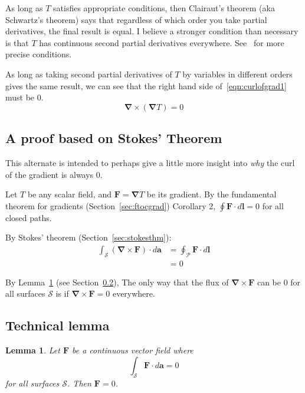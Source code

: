 \documentclass[a4paper]{article}
\theoremstyle{plain}
\newtheorem{lemma}[theorem]{Lemma}
\theoremstyle{definition}
\newcommand{\vect}[1]{\textbf{#1}}
\newcommand{\del}{\bm{\nabla}}
\begin{document}
As long as $T$ satisfies appropriate conditions, then Clairaut's
theorem (aka Schwartz's theorem) says that regardless of which order
you take partial derivatives, the final result is equal.  I believe a
stronger condition than necessary is that $T$ has continuous second
partial derivatives everywhere.
See~\cite{SymmetryOfSecondDerivatives} for more precise conditions.

As long as taking second partial derivatives of $T$ by variables in
different orders gives the same result, we can see that the right hand
side of~\eqref{eqn:curlofgrad1} must be 0.
\begin{equation}
\del \times (\del T) = 0
\end{equation}


\subsection{A proof based on Stokes' Theorem}

This alternate is intended to perhaps give a little more insight into
{\em why} the curl of the gradient is always 0.

Let $T$ be any scalar field, and $\vect{F} = \del T$ be its gradient.
By the fundamental theorem for gradients (Section~\ref{sec:ftocgrad})
Corollary 2, $\oint \vect{F} \cdot d\vect{l} = 0$ for all closed
paths.

By Stokes' theorem (Section~\ref{sec:stokesthm}):
\begin{align*}
\int_{\mathcal{S}} (\del \times \vect{F}) \cdot d\vect{a} & = \oint_{\mathcal{P}} \vect{F} \cdot d\vect{l} \\
   & = 0
\end{align*}

By Lemma~\ref{lem:techlemma1} (see Section~\ref{sec:techlemma1}),
The only way that the flux of $\del \times \vect{F}$ can be 0 for all
surfaces $\mathcal{S}$ is if $\del \times \vect{F} = 0$ everywhere.


\subsection{Technical lemma}
\label{sec:techlemma1}

\begin{lemma}
\label{lem:techlemma1}
Let $\vect{F}$ be a continuous vector field where
\begin{equation}
\int_{\mathcal{S}} \vect{F} \cdot d\vect{a} = 0
\end{equation}
for all surfaces $\mathcal{S}$.  Then $\vect{F} = 0$.
\end{lemma}
\end{document}
